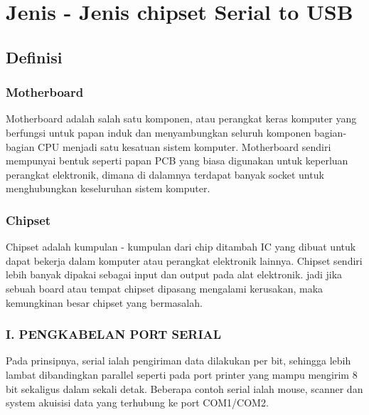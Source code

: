 \section{Jenis - Jenis chipset Serial to USB}
\subsection{Definisi}
\subsubsection{Motherboard}
Motherboard adalah salah satu komponen, atau perangkat keras komputer yang berfungsi  untuk papan induk dan menyambungkan seluruh komponen bagian-bagian CPU menjadi satu kesatuan sistem komputer. Motherboard sendiri  mempunyai  bentuk seperti  papan PCB yang biasa digunakan untuk keperluan perangkat elektronik, dimana di dalamnya terdapat banyak socket untuk menghubungkan keseluruhan sistem komputer.
\subsubsection{Chipset}
Chipset adalah kumpulan - kumpulan dari chip ditambah IC yang dibuat untuk dapat bekerja dalam komputer atau perangkat elektronik lainnya.
Chipset sendiri lebih banyak dipakai sebagai input dan output pada alat elektronik. jadi jika sebuah board atau tempat chipset dipasang mengalami kerusakan, maka kemungkinan besar chipset yang bermasalah.

\subsubsection{I. PENGKABELAN PORT SERIAL}

Pada prinsipnya, serial ialah pengiriman data dilakukan per bit, sehingga lebih lambat dibandingkan parallel seperti pada port printer yang mampu mengirim 8 bit sekaligus dalam sekali detak. Beberapa contoh serial ialah mouse, scanner dan system akuisisi data yang terhubung ke port COM1/COM2.


